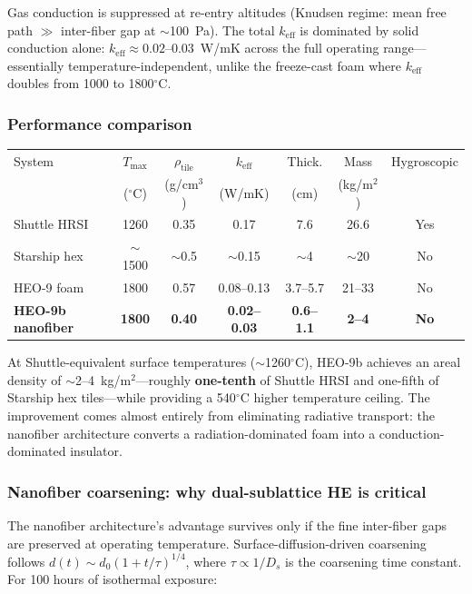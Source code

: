 \documentclass[12pt,letterpaper]{article}
\theoremstyle{definition}
\begin{document}
Gas conduction is suppressed at re-entry altitudes (Knudsen regime: mean free path $\gg$ inter-fiber gap at $\sim$100~Pa).  The total $k_{\mathrm{eff}}$ is dominated by solid conduction alone: $k_{\mathrm{eff}} \approx 0.02$--$0.03$~W/mK across the full operating range---essentially temperature-independent, unlike the freeze-cast foam where $k_{\mathrm{eff}}$ doubles from 1000 to 1800$^\circ$C.

\subsubsection{Performance comparison}

\begin{center}
\small
\begin{tabular}{@{}lcccccc@{}}
\toprule
System & $T_{\max}$ & $\rho_{\mathrm{tile}}$ & $k_{\mathrm{eff}}$ & Thick. & Mass & Hygroscopic \\
 & ($^\circ$C) & (g/cm$^3$) & (W/mK) & (cm) & (kg/m$^2$) & \\
\midrule
Shuttle HRSI & 1260 & 0.35 & 0.17 & 7.6 & 26.6 & Yes \\
Starship hex & $\sim$1500 & $\sim$0.5 & $\sim$0.15 & $\sim$4 & $\sim$20 & No \\
HEO-9 foam & 1800 & 0.57 & 0.08--0.13 & 3.7--5.7 & 21--33 & No \\
\textbf{HEO-9b nanofiber} & \textbf{1800} & \textbf{0.40} & \textbf{0.02--0.03} & \textbf{0.6--1.1} & \textbf{2--4} & \textbf{No} \\
\bottomrule
\end{tabular}
\normalsize
\end{center}

At Shuttle-equivalent surface temperatures ($\sim$1260$^\circ$C), HEO-9b achieves an areal density of $\sim$2--4~kg/m$^2$---roughly \textbf{one-tenth} of Shuttle HRSI and one-fifth of Starship hex tiles---while providing a 540$^\circ$C higher temperature ceiling.  The improvement comes almost entirely from eliminating radiative transport: the nanofiber architecture converts a radiation-dominated foam into a conduction-dominated insulator.

\subsubsection{Nanofiber coarsening: why dual-sublattice HE is critical}

The nanofiber architecture's advantage survives only if the fine inter-fiber gaps are preserved at operating temperature.  Surface-diffusion-driven coarsening follows $d(t) \sim d_0 (1 + t/\tau)^{1/4}$, where $\tau \propto 1/D_s$ is the coarsening time constant.  For 100 hours of isothermal exposure:
\end{document}
